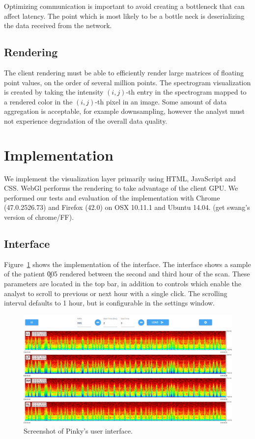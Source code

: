 Optimizing communication is important to avoid creating a bottleneck that can
affect latency. The point which is most likely to be a bottle neck is
deserializing the data received from the network.

\subsection{Rendering}

The client rendering must be able to efficiently render large matrices of
floating point values, on the order of several million points.  The spectrogram
visualization is created by taking the intensity $(i, j)$-th entry in the
spectrogram mapped to a rendered color in the $(i, j)$-th pixel in an image.
Some amount of data aggregation is acceptable, for example downsampling,
however the  analyst must not experience degradation of the overall data
quality. \\

\section{Implementation}

We implement the visualization layer primarily using HTML, JavaScript and CSS.
WebGl performs the rendering to take advantage of the client GPU. We performed
our tests and evaluation of the implementation with Chrome (47.0.2526.73) and
Firefox (42.0) on OSX 10.11.1 and Ubuntu 14.04. (get swang's version of
chrome/FF).

\subsection{Interface}

Figure~\ref{fig:whole-interface} shows the implementation of the interface. The
interface shows a sample of the patient \c{005} rendered between the second and
third hour of the scan. These parameters are located in the top bar, in
addition to controls which enable the analyst to scroll to previous or next
hour with a single click. The scrolling interval defaults to 1 hour, but is
configurable in the settings window. \\

\begin{figure}[h]
\begin{center}
\includegraphics[scale=0.35]{./img/whole-interface.png}
\caption{Screenshot of Pinky's user interface.}
\label{fig:whole-interface}
\end{center}
\end{figure}

